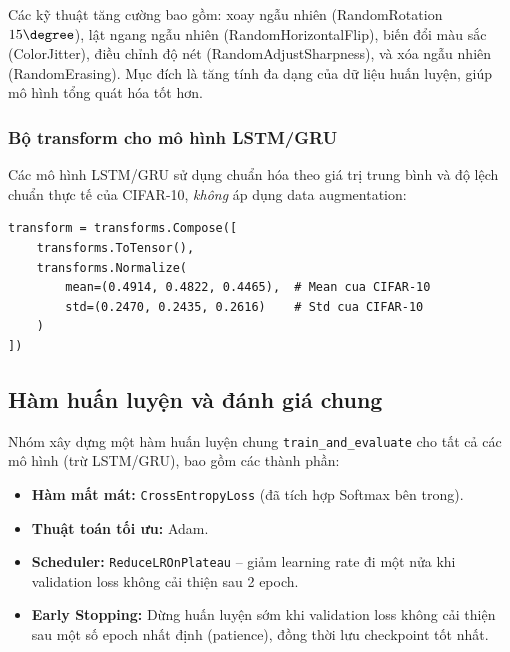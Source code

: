 \documentclass[a4paper]{article}
\newcommand{\code}[1]{\texttt{\textcolor{blue!80!black}{#1}}}
\theoremstyle{definition}
\begin{document}
Các kỹ thuật tăng cường bao gồm: xoay ngẫu nhiên (RandomRotation $15\degree$), lật ngang ngẫu nhiên (RandomHorizontalFlip), biến đổi màu sắc (ColorJitter), điều chỉnh độ nét (RandomAdjustSharpness), và xóa ngẫu nhiên (RandomErasing). Mục đích là tăng tính đa dạng của dữ liệu huấn luyện, giúp mô hình tổng quát hóa tốt hơn.

\subsubsection{Bộ transform cho mô hình LSTM/GRU}
Các mô hình LSTM/GRU sử dụng chuẩn hóa theo giá trị trung bình và độ lệch chuẩn thực tế của CIFAR-10, \textit{không} áp dụng data augmentation:

\begin{verbatim}
transform = transforms.Compose([
    transforms.ToTensor(),
    transforms.Normalize(
        mean=(0.4914, 0.4822, 0.4465),  # Mean cua CIFAR-10
        std=(0.2470, 0.2435, 0.2616)    # Std cua CIFAR-10
    )
])
\end{verbatim}

\subsection{Hàm huấn luyện và đánh giá chung}
Nhóm xây dựng một hàm huấn luyện chung \code{train\_and\_evaluate} cho tất cả các mô hình (trừ LSTM/GRU), bao gồm các thành phần:

\begin{itemize}
	\item \textbf{Hàm mất mát:} \code{CrossEntropyLoss} (đã tích hợp Softmax bên trong).
	\item \textbf{Thuật toán tối ưu:} Adam.
	\item \textbf{Scheduler:} \code{ReduceLROnPlateau} -- giảm learning rate đi một nửa khi validation loss không cải thiện sau 2 epoch.
	\item \textbf{Early Stopping:} Dừng huấn luyện sớm khi validation loss không cải thiện sau một số epoch nhất định (patience), đồng thời lưu checkpoint tốt nhất.
\end{itemize}
\end{document}
